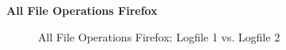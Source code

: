 \begin{appendices}
		
		\huge{\textbf{All File Operations Firefox}}
		\begin{figure}[h!]
			\centerline{}
			\caption{All File Operations Firefox: Logfile 1 vs. Logfile 2}
		\end{figure}
		

\end{appendices}
